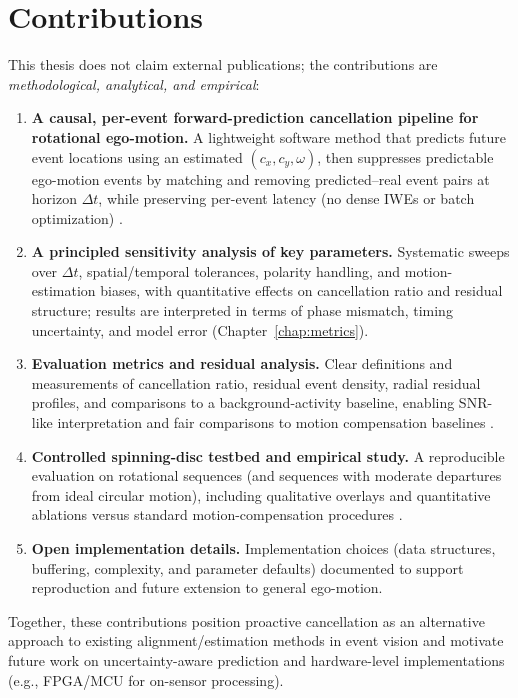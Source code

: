 \section{Contributions}
\label{sec:contributions}

This thesis does not claim external publications; the contributions are \emph{methodological, analytical, and empirical}:

\begin{enumerate}
    \item \textbf{A causal, per-event forward-prediction cancellation pipeline for rotational ego-motion.} A lightweight software method that predicts future event locations using an estimated $(c_x,c_y,\omega)$, then suppresses predictable ego-motion events by matching and removing predicted–real event pairs at horizon $\Delta t$, while preserving per-event latency (no dense IWEs or batch optimization) \cite{Bardow2016SOFIE,Gallego2018CMax}.
    \item \textbf{A principled sensitivity analysis of key parameters.} Systematic sweeps over $\Delta t$, spatial/temporal tolerances, polarity handling, and motion-estimation biases, with quantitative effects on cancellation ratio and residual structure; results are interpreted in terms of phase mismatch, timing uncertainty, and model error (Chapter~\ref{chap:metrics}).
    \item \textbf{Evaluation metrics and residual analysis.} Clear definitions and measurements of cancellation ratio, residual event density, radial residual profiles, and comparisons to a background-activity baseline, enabling SNR-like interpretation and fair comparisons to motion compensation baselines \cite{Gallego2020Survey,Bardow2016SOFIE,Gallego2018CMax,Xu2020}.
    \item \textbf{Controlled spinning-disc testbed and empirical study.} A reproducible evaluation on rotational sequences (and sequences with moderate departures from ideal circular motion), including qualitative overlays and quantitative ablations versus standard motion-compensation procedures \cite{Gallego2018CMax,Bardow2016SOFIE,Stoffregen2019Segmentation}.
    \item \textbf{Open implementation details.} Implementation choices (data structures, buffering, complexity, and parameter defaults) documented to support reproduction and future extension to general ego-motion.
\end{enumerate}
Together, these contributions position proactive cancellation as an alternative approach to existing alignment/estimation methods in event vision \cite{Bardow2016SOFIE,Rebecq2017EVO,Gallego2018CMax} and motivate future work on uncertainty-aware prediction and hardware-level implementations (e.g., FPGA/MCU for on-sensor processing).

